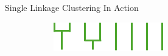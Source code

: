 \documentclass{beamer}
\begin{document}
\begin{frame}{Single Linkage Clustering In Action}
{\begin{figure}[!h]
\begin{subfigure}{.2\linewidth}
      \end{subfigure}%
      \hspace{5em}
      \begin{subfigure}{.5\linewidth}
        \centering
        \includegraphics[width=.9\textwidth]{sixdend.png}
      \end{subfigure}
      \end{figure}}
  
  

\end{frame}
\end{document}
